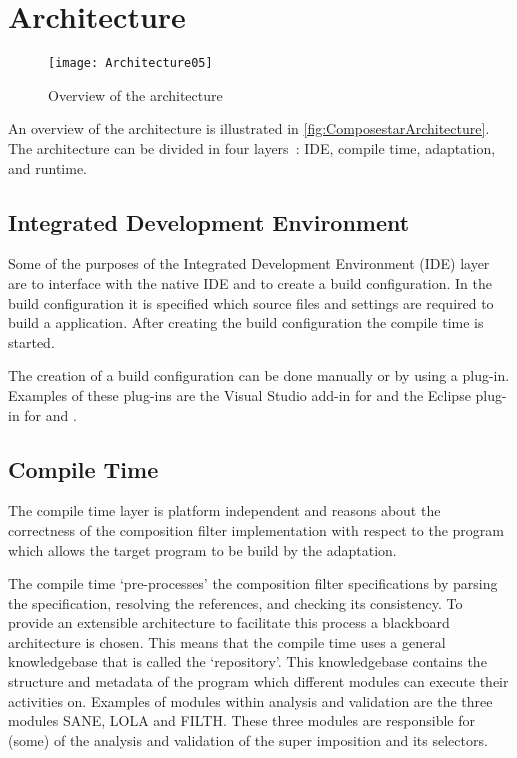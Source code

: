 \section{\Compose* Architecture}
\label{sec:TheComposestarArchitecture}
\begin{figure}
  \centering
  \texttt{[image: Architecture05]}
  \caption[Overview of the \Compose* architecture]{%
    Overview of the \Compose* architecture}
  \label{fig:ComposestarArchitecture}
\end{figure}
An overview of the \Compose* architecture is illustrated in \autoref{fig:ComposestarArchitecture}.
The \Compose* architecture can be divided in four layers~\cite{Nagy2006}: IDE, compile time, adaptation, and runtime. 

\subsection{Integrated Development Environment}
Some of the purposes of the Integrated Development Environment (IDE) layer are to interface with the native IDE and to create a build configuration.
In the build configuration it is specified which source files and settings are required to build a \Compose* application.
After creating the build configuration the compile time is started.

The creation of a build configuration can be done manually or by using a plug-in.
Examples of these plug-ins are the Visual Studio add-in for \Compose*[.NET] and the Eclipse plug-in for \Compose*[J] and \Compose*[C].

\subsection{Compile Time}
The compile time layer is platform independent and reasons about the correctness of the composition filter implementation with respect to the program which allows the target program to be build by the adaptation.

The compile time `pre-processes' the composition filter specifications by parsing the specification, resolving the references, and checking its consistency.
To provide an extensible architecture to facilitate this process a blackboard architecture is chosen.
This means that the compile time uses a general knowledgebase that is called the `repository'.
This knowledgebase contains the structure and metadata of the program which different modules can execute their activities on.
Examples of modules within analysis and validation are the three modules SANE, LOLA and FILTH.
These three modules are responsible for (some) of the analysis and validation of the super imposition and its selectors.

